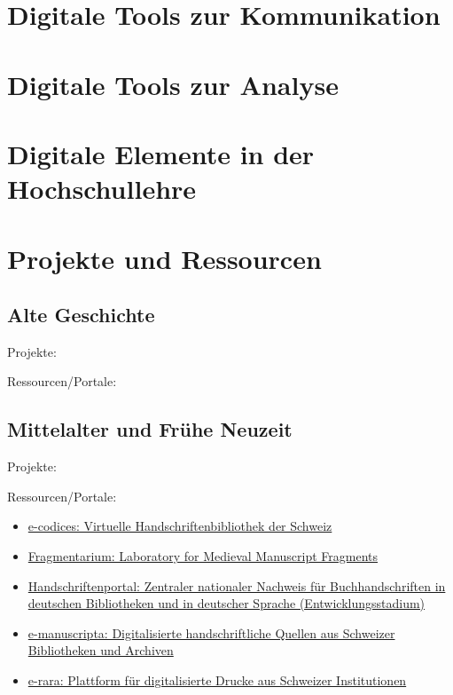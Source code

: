 \documentclass[
  letterpaper,
]{book}
\begin{document}
\hypertarget{digitale-tools-zur-kommunikation}{%
\section{Digitale Tools zur
Kommunikation}\label{digitale-tools-zur-kommunikation}}

\hypertarget{digitale-tools-zur-analyse}{%
\section{Digitale Tools zur Analyse}\label{digitale-tools-zur-analyse}}

\hypertarget{digitale-elemente-in-der-hochschullehre}{%
\section{Digitale Elemente in der
Hochschullehre}\label{digitale-elemente-in-der-hochschullehre}}

\hypertarget{sec-projects}{%
\section{Projekte und Ressourcen}\label{sec-projects}}

\hypertarget{alte-geschichte}{%
\subsection{Alte Geschichte}\label{alte-geschichte}}

Projekte:

Ressourcen/Portale:

\hypertarget{sec-projects-ma-fnz}{%
\subsection{Mittelalter und Frühe Neuzeit}\label{sec-projects-ma-fnz}}

Projekte:

Ressourcen/Portale:

\begin{itemize}
\item
  \href{https://www.e-codices.unifr.ch/de}{e-codices: Virtuelle
  Handschriftenbibliothek der Schweiz}
\item
  \href{https://fragmentarium.ms/}{Fragmentarium: Laboratory for
  Medieval Manuscript Fragments}
\item
  \href{https://handschriftenportal.de/}{Handschriftenportal: Zentraler
  nationaler Nachweis für Buchhandschriften in deutschen Bibliotheken
  und in deutscher Sprache (Entwicklungsstadium)}
\item
  \href{https://www.e-manuscripta.ch/?lang=de}{e-manuscripta:
  Digitalisierte handschriftliche Quellen aus Schweizer Bibliotheken und
  Archiven}
\item
  \href{https://www.e-rara.ch/?lang=de}{e-rara: Plattform für
  digitalisierte Drucke aus Schweizer Institutionen}
\end{itemize}
\end{document}
